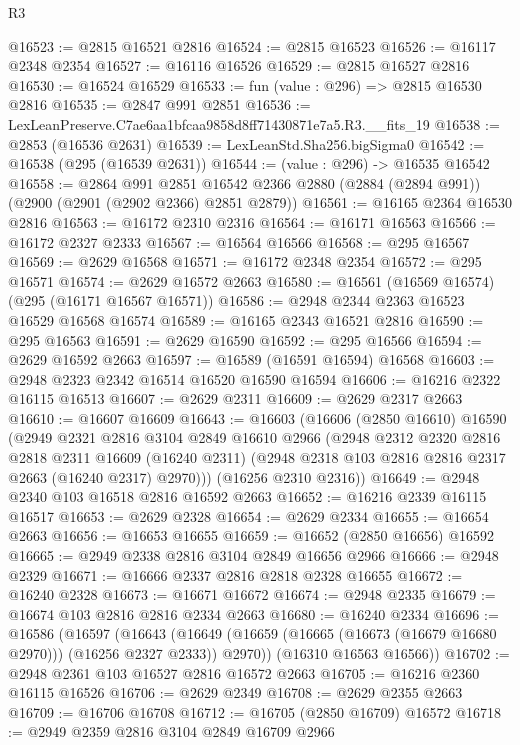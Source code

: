 \begin{lexlean}{R3}
\begin{coremodule}
@16523 := @2815 @16521 @2816
@16524 := @2815 @16523
@16526 := @16117 @2348 @2354
@16527 := @16116 @16526
@16529 := @2815 @16527 @2816
@16530 := @16524 @16529
@16533 := fun (value : @296) => @2815 @16530 @2816
@16535 := @2847 @991 @2851
@16536 := LexLeanPreserve.C7ae6aa1bfcaa9858d8ff71430871e7a5.R3.__fits_19
@16538 := @2853 (@16536 @2631)
@16539 := LexLeanStd.Sha256.bigSigma0
@16542 := @16538 (@295 (@16539 @2631))
@16544 := (value : @296) -> @16535 @16542
@16558 := @2864
    @991
    @2851
    @16542
    @2366
    @2880
    (@2884 (@2894 @991))
    (@2900 (@2901 (@2902 @2366) @2851 @2879))
@16561 := @16165 @2364 @16530 @2816
@16563 := @16172 @2310 @2316
@16564 := @16171 @16563
@16566 := @16172 @2327 @2333
@16567 := @16564 @16566
@16568 := @295 @16567
@16569 := @2629 @16568
@16571 := @16172 @2348 @2354
@16572 := @295 @16571
@16574 := @2629 @16572 @2663
@16580 := @16561 (@16569 @16574) (@295 (@16171 @16567 @16571))
@16586 := @2948 @2344 @2363 @16523 @16529 @16568 @16574
@16589 := @16165 @2343 @16521 @2816
@16590 := @295 @16563
@16591 := @2629 @16590
@16592 := @295 @16566
@16594 := @2629 @16592 @2663
@16597 := @16589 (@16591 @16594) @16568
@16603 := @2948 @2323 @2342 @16514 @16520 @16590 @16594
@16606 := @16216 @2322 @16115 @16513
@16607 := @2629 @2311
@16609 := @2629 @2317 @2663
@16610 := @16607 @16609
@16643 := @16603
    (@16606
      (@2850 @16610)
      @16590
      (@2949
        @2321
        @2816
        @3104
        @2849
        @16610
        @2966
        (@2948
          @2312
          @2320
          @2816
          @2818
          @2311
          @16609
          (@16240 @2311)
          (@2948 @2318 @103 @2816 @2816 @2317 @2663 (@16240 @2317) @2970)))
      (@16256 @2310 @2316))
@16649 := @2948 @2340 @103 @16518 @2816 @16592 @2663
@16652 := @16216 @2339 @16115 @16517
@16653 := @2629 @2328
@16654 := @2629 @2334
@16655 := @16654 @2663
@16656 := @16653 @16655
@16659 := @16652 (@2850 @16656) @16592
@16665 := @2949 @2338 @2816 @3104 @2849 @16656 @2966
@16666 := @2948 @2329
@16671 := @16666 @2337 @2816 @2818 @2328 @16655
@16672 := @16240 @2328
@16673 := @16671 @16672
@16674 := @2948 @2335
@16679 := @16674 @103 @2816 @2816 @2334 @2663
@16680 := @16240 @2334
@16696 := @16586
    (@16597
      (@16643 (@16649 (@16659 (@16665 (@16673 (@16679 @16680 @2970))) (@16256 @2327 @2333)) @2970))
      (@16310 @16563 @16566))
@16702 := @2948 @2361 @103 @16527 @2816 @16572 @2663
@16705 := @16216 @2360 @16115 @16526
@16706 := @2629 @2349
@16708 := @2629 @2355 @2663
@16709 := @16706 @16708
@16712 := @16705 (@2850 @16709) @16572
@16718 := @2949 @2359 @2816 @3104 @2849 @16709 @2966

\end{coremodule}
\end{lexlean}

